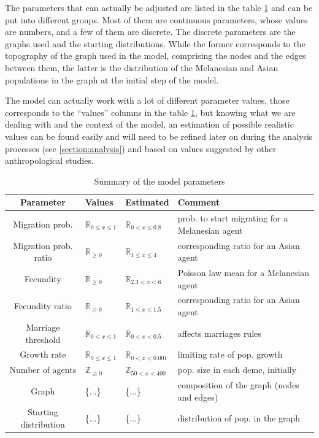 \documentclass[a4paper,12pt]{report}
\begin{document}
The parameters that can actually be adjusted are listed in the table \ref{parameters} and can be put into different groups. Most of them are continuous parameters, whose values are numbers, and a few of them are discrete. The discrete parameters are the graphs used and the starting distributions. While the former corresponds to the topography of the graph used in the model, comprising the nodes and the edges between them, the latter is the distribution of the Melanesian and Asian populations in the graph at the initial step of the model.

The model can actually work with a lot of different parameter values, those corresponds to the “values” columns in the table \ref{parameters}, but knowing what we are dealing with and the context of the model, an estimation of possible realistic values can be found easily and will need to be refined later on during the analysis processes (see \ref{section:analysis}) and based on values suggested by other anthropological studies.

\begin{table}
	\hspace*{-1.5cm}
	\begin{tabular}{|c|l|l|l|}
		\hline
 		Parameter & Values & Estimated & Comment \\ \hline
        Migration prob. & $\mathbb{R}_{0 \leq x \leq 1}$ & $\mathbb{R}_{0 < x \leq 0.8}$ & prob. to start migrating for a Melanesian agent \\ \hline
        Migration prob. ratio & $\mathbb{R}_{\geq 0}$ & $\mathbb{R}_{1 \leq x \leq 4}$ & corresponding ratio for an Asian agent \\ \hline
        Fecundity & $\mathbb{R}_{\geq 0}$ & $\mathbb{R}_{2.3 < x < 6}$ & Poisson law mean for a Melanesian agent \\ \hline
        Fecundity ratio & $\mathbb{R}_{\geq 0}$ & $\mathbb{R}_{1 \leq x \leq 1.5}$ & corresponding ratio for an Asian agent \\ \hline
        Marriage threshold & $\mathbb{R}_{0 \leq x \leq 1}$ & $\mathbb{R}_{0 < x < 0.5}$ & affects marriages rules \\ \hline
        Growth rate & $\mathbb{R}_{0 \leq x \leq 1}$ & $\mathbb{R}_{0 < x < 0.001}$ & limiting rate of pop. growth \\ \hline
        Number of agents & $\mathbb{Z}_{\geq 0}$ & $\mathbb{Z}_{50 < x < 400}$ & pop. size in each deme, initially \\ \hline
        Graph & \{...\} & \{...\} & composition of the graph (nodes and edges) \\ \hline
        Starting distribution & \{...\} & \{...\} & distribution of pop. in the graph \\ \hline
	\end{tabular}
	\caption{Summary of the model parameters}
	\label{parameters}
\end{table}
\end{document}
